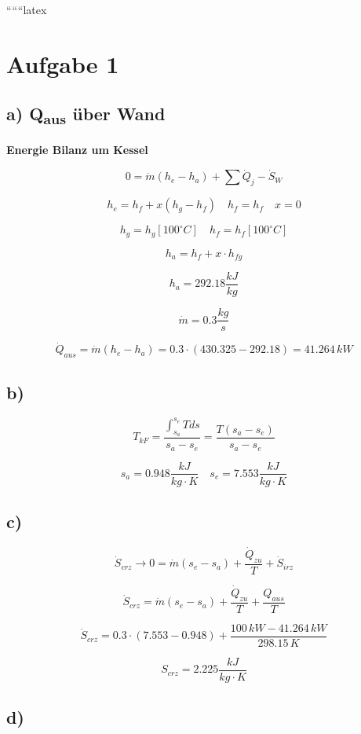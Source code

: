 
``````latex


\section*{Aufgabe 1}

\subsection*{a) Q\textsubscript{aus} über Wand}

\textbf{Energie Bilanz um Kessel}

\[
0 = \dot{m} \left( h_e - h_a \right) + \sum \dot{Q}_j - \dot{S}_{W}
\]

\[
h_e = h_{f} + x \left( h_{g} - h_{f} \right) \quad h_{f} = h_{f} \quad x = 0
\]

\[
h_{g} = h_{g} \left[ 100^\circ C \right] \quad h_{f} = h_{f} \left[ 100^\circ C \right]
\]

\[
h_a = h_{f} + x \cdot h_{fg}
\]

\[
h_a = 292.18 \frac{kJ}{kg}
\]

\[
\dot{m} = 0.3 \frac{kg}{s}
\]

\[
\dot{Q}_{aus} = \dot{m} \left( h_e - h_a \right) = 0.3 \cdot \left( 430.325 - 292.18 \right) = 41.264 \, kW
\]

\subsection*{b)}

\[
T_{kF} = \frac{\int_{s_a}^{s_e} T ds}{s_a - s_e} = \frac{T \left( s_a - s_e \right)}{s_a - s_e}
\]

\[
s_a = 0.948 \frac{kJ}{kg \cdot K} \quad s_e = 7.553 \frac{kJ}{kg \cdot K}
\]

\subsection*{c)}

\[
\dot{S}_{crz} \rightarrow 0 = \dot{m} \left( s_e - s_a \right) + \frac{\dot{Q}_{zu}}{T} + \dot{S}_{irz}
\]

\[
\dot{S}_{crz} = \dot{m} \left( s_e - s_a \right) + \frac{\dot{Q}_{zu}}{T} + \frac{Q_{aus}}{T}
\]

\[
\dot{S}_{crz} = 0.3 \cdot \left( 7.553 - 0.948 \right) + \frac{100 \, kW - 41.264 \, kW}{298.15 \, K}
\]

\[
S_{crz} = 2.225 \frac{kJ}{kg \cdot K}
\]

\subsection*{d)}

